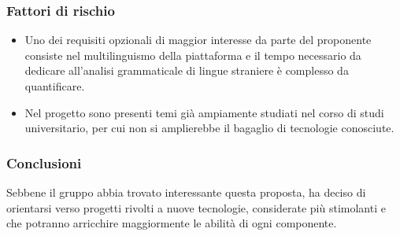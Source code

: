\subsubsection{Fattori di rischio}
\begin{itemize}
	\item Uno dei requisiti opzionali di maggior interesse da parte del
	 proponente consiste nel multilinguismo della piattaforma e il tempo
	 necessario da dedicare all'analisi grammaticale di lingue straniere è
	 complesso da quantificare.
	
	\item Nel progetto sono presenti temi già ampiamente studiati nel corso di
	 studi universitario, per cui non si amplierebbe il bagaglio di
	 tecnologie conosciute.
 	
\end{itemize}
\subsubsection{Conclusioni}
Sebbene il gruppo abbia trovato interessante questa proposta, ha deciso
di orientarsi verso progetti rivolti a nuove tecnologie, considerate più
stimolanti e che potranno arricchire maggiormente le abilità di ogni 
componente. 


